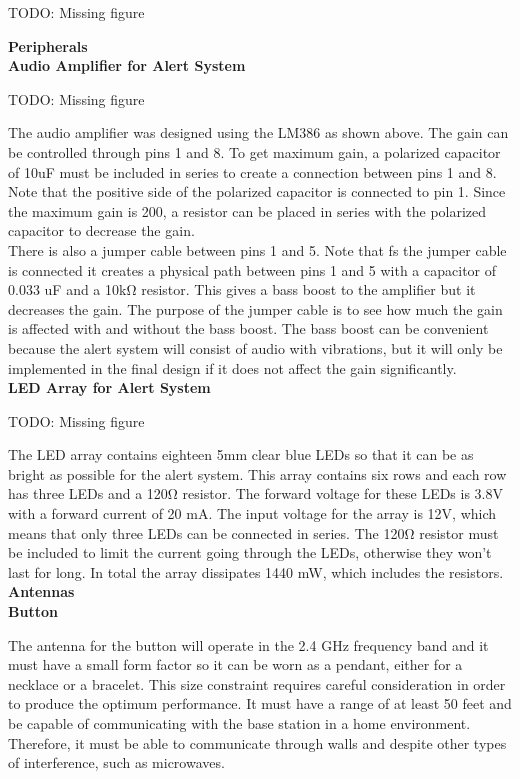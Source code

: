\documentclass[journal,compsoc]{IEEEtran}
\begin{document}
TODO: Missing figure

\noindent \textbf {Peripherals}\\

\noindent \textbf {Audio Amplifier for Alert System}

TODO: Missing figure

\noindent The audio amplifier was designed using the LM386 as shown above.  The gain can be controlled through pins 1 and 8.  To get maximum gain, a polarized capacitor of 10uF must be included in series to create a connection between pins 1 and 8.  Note that the positive side of the polarized capacitor is connected to pin 1.  Since the maximum gain is 200, a resistor can be placed in series with the polarized capacitor to decrease the gain.\\

\noindent There is also a jumper cable between pins 1 and 5.  Note that fs the jumper cable is connected it creates a physical path between pins 1 and 5 with a capacitor of 0.033 uF and a 10kΩ resistor.  This gives a bass boost to the amplifier but it decreases the gain.  The purpose of the jumper cable is to see how much the gain is affected with and without the bass boost.  The bass boost can be convenient because the alert system will consist of audio with vibrations, but it will only be implemented in the final design if it does not affect the gain significantly.\\

\noindent \textbf {LED Array for Alert System}

TODO: Missing figure

\noindent The LED array contains eighteen 5mm clear blue LEDs so that it can be as bright as possible for the alert system.  This array contains six rows and each row has three LEDs and a 120Ω resistor.  The forward voltage for these LEDs is 3.8V with a forward current of 20 mA.  The input voltage for the array is 12V, which means that only three LEDs can be connected in series.  The 120Ω resistor must be included to limit the current going through the LEDs, otherwise they won’t last for long.  In total the array dissipates 1440 mW, which includes the resistors.\\

\noindent \textbf {Antennas}\\

\noindent \textbf {Button}

\noindent The antenna for the button will operate in the 2.4 GHz frequency band and it must have a small form factor so it can be worn as a pendant, either for a necklace or a bracelet.  This size constraint requires careful consideration in order to produce the optimum performance.  It must have a range of at least 50 feet and be capable of communicating with the base station in a home environment.  Therefore, it must be able to communicate through walls and despite other types of interference, such as microwaves.\\
\end{document}
